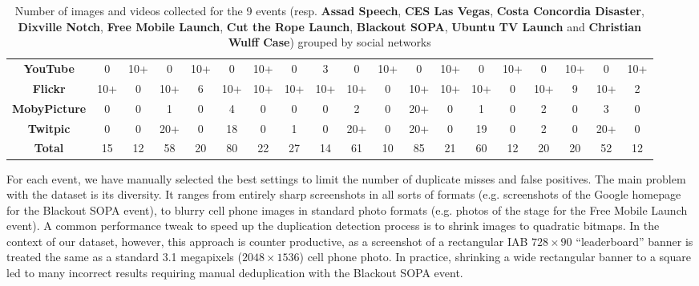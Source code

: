 \begin{table}[htbp]
{{\begin{tabular}{|c|c|c|c|c|c|c|c|c|c|c|c|c|c|c|c|c|c|c|}
    \textbf{YouTube} & 0 & 10+ & 0 & 10+ & 0 & 10+ & 0 & 3 & 0 & 10+ & 0 & 10+ & 0 & 10+ & 0 & 10+ & 0 & 10+\\
    \textbf{Flickr} & 10+ & 0 & 10+ & 6 & 10+ & 10+ & 10+ & 10+ & 10+ & 0 & 10+ & 10+ & 10+ & 0 & 10+ & 9 & 10+ & 2\\
    \textbf{MobyPicture} & 0 & 0 & 1 & 0 & 4 & 0 & 0 & 0 & 2 & 0 & 20+ & 0 & 1 & 0 & 2 & 0 & 3 & 0\\
    \textbf{Twitpic} & 0 & 0 & 20+ & 0 & 18 & 0 & 1 & 0 & 20+ & 0 & 20+ & 0 & 19 & 0 & 2 & 0 & 20+ & 0\\
    \hline
    \textbf{Total} & 15 & 12 & 58 & 20 & 80 & 22 & 27 & 14 & 61 & 10 & 85 & 21 & 60 & 12 & 20 & 20 & 52 & 12\\
    \hline
  \end{tabular}
  }
  \label{tab:number-media}
  \caption{Number of images and videos collected for the 9 events (resp. \textbf{Assad Speech}, \textbf{CES Las Vegas}, \textbf{Costa Concordia Disaster}, \textbf{Dixville Notch}, \textbf{Free Mobile Launch}, \textbf{Cut the Rope Launch}, \textbf{Blackout SOPA}, \textbf{Ubuntu TV Launch} and \textbf{Christian Wulff Case}) grouped by social networks}
  }
\end{table}
For each event, we have manually selected the best settings to limit the number of duplicate misses and false positives. The main problem with the dataset is its diversity. It ranges from entirely sharp screenshots in all sorts of formats (e.g. screenshots of the Google homepage for the Blackout SOPA event), to blurry cell phone images in standard photo formats (e.g. photos of the stage for the Free Mobile Launch event). A common performance tweak to speed up the duplication detection process is to shrink images to quadratic bitmaps. In the context of our dataset, however, this approach is counter productive, as a screenshot of a rectangular IAB $728 \times 90$ ``leaderboard'' banner is treated the same as a standard 3.1 megapixels ($2048 \times 1536$) cell phone photo. In practice, shrinking a wide rectangular banner to a square led to many incorrect results requiring manual deduplication with the Blackout SOPA event.
